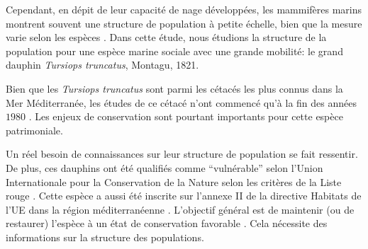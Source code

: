 \documentclass[a4paper,12pt,twoside]{article}\usepackage[]{graphicx}\usepackage[]{color}
\begin{document}
Cependant, en dépit de leur capacité de nage développées, les mammifères marins montrent souvent une structure de population à petite échelle, bien que la mesure varie selon les espèces \citep{hoelzel2002low}. Dans cette étude, nous étudions la structure de la population pour une espèce marine sociale avec une grande mobilité: le grand dauphin \emph{Tursiops truncatus}, Montagu, 1821.

Bien que les \emph{Tursiops truncatus} sont parmi les cétacés les plus connus dans la Mer Méditerranée, les études de ce cétacé n'ont commencé qu'à la fin des années $1980$ \citep{bearzi2009ecology}. Les enjeux de conservation sont pourtant importants pour cette espèce patrimoniale. 

Un réel besoin de connaissances sur leur structure de population se fait ressentir. De plus, ces dauphins ont été qualifiés comme ``vulnérable'' selon l'Union Internationale pour la Conservation de la Nature selon les critères de la Liste rouge \citep{bearzi2006common}. Cette espèce a aussi été inscrite sur l'annexe II de la directive Habitats de l'UE dans la région méditerranéenne \citep{Laran2016}. L'objectif général est de maintenir (ou de restaurer) l'espèce à un état de conservation favorable \citep{evans2004monitoring}. Cela nécessite des informations sur la structure des populations.
\end{document}

